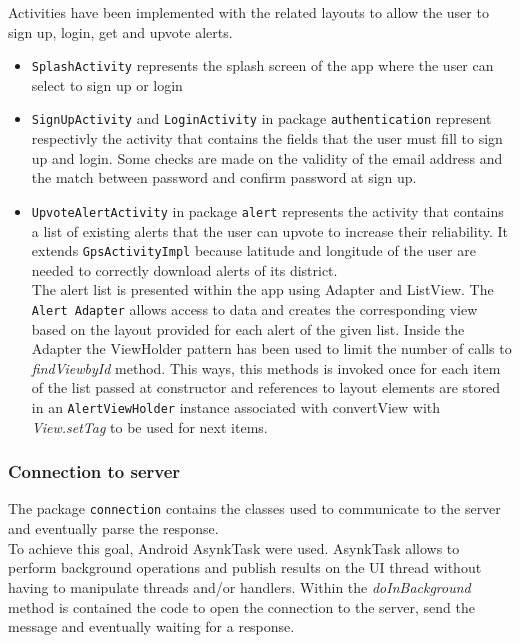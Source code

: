 \documentclass[a4paper,12pt]{report}
\begin{document}
Activities have been implemented with the related layouts to allow the user to sign up, login, get and upvote alerts.
\begin{itemize}
\item \texttt{SplashActivity} represents the splash screen of the app where the user can select to sign up or login
\item \texttt{SignUpActivity} and \texttt{LoginActivity} in package \texttt{authentication} represent respectivly the activity that contains the fields that the user must fill to sign up and login. Some checks are made on the validity of the email address and the match between password and confirm password at sign up.
\item \texttt{UpvoteAlertActivity} in package \texttt{alert} represents the activity that contains a list of existing alerts that the user can upvote to increase their reliability. It extends \texttt{GpsActivityImpl} because latitude and longitude of the user are needed to correctly download alerts of its district. \\
The alert list is presented within the app using Adapter and ListView. The \texttt{Alert Adapter} allows access to data and creates the corresponding view based on the layout provided for each alert of the given list. Inside the Adapter the ViewHolder pattern has been used to limit the number of calls to \textit{findViewbyId} method. This ways, this methods is invoked once for each item of the list passed at constructor and references to layout elements are stored in an \texttt{AlertViewHolder} instance associated with convertView with \textit{View.setTag} to be used for next items.
\end{itemize}

\subsubsection{Connection to server}
The package \texttt{connection} contains the classes used to communicate to the server and eventually parse the response.
\\To achieve this goal, Android AsynkTask were used. AsynkTask allows to perform background operations and publish results on the UI thread without having to manipulate threads and/or handlers. Within the \textit{doInBackground} method is contained the code to open the connection to the server, send the message and eventually waiting for a response.
\end{document}
